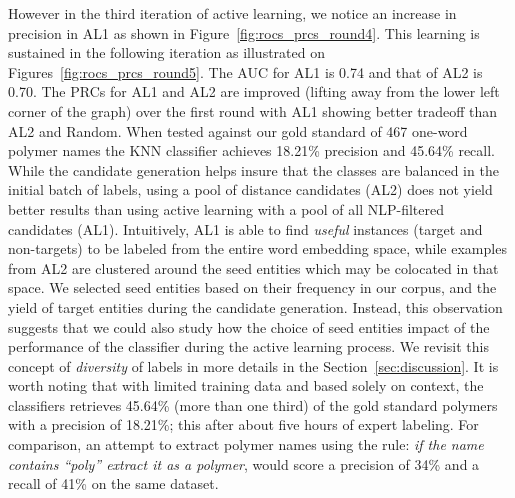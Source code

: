 However in the third iteration of active learning, we notice an increase in precision in AL1 as shown in Figure~\ref{fig:rocs_prcs_round4}.
This learning is sustained in the following iteration as illustrated on Figures~\ref{fig:rocs_prcs_round5}. 
The AUC for AL1 is 0.74 and that of AL2 is 0.70. 
The PRCs for AL1 and AL2 are improved (lifting away from the lower left corner of the graph) over the first round with AL1 showing better tradeoff than AL2 and Random.
When tested against our gold standard of 467 one-word polymer names the KNN classifier achieves 18.21\% precision and  45.64\% recall. 
While the candidate generation helps insure that the classes are balanced in the initial batch of labels, using a pool of distance candidates (AL2) does not yield better results than using active learning with a pool of all NLP-filtered candidates (AL1).
Intuitively, AL1 is able to find \textit{useful} instances (target and non-targets) to be labeled from the entire word embedding space, while examples from AL2 are clustered around the seed entities which may be colocated in that space.
We selected seed entities based on their frequency in our corpus, and the yield of target entities during the candidate generation.
Instead, this observation suggests that we could also study how the choice of seed entities impact of the performance of the classifier during the active learning process. 
We revisit this concept of \textit{diversity} of labels in more details in the Section~\ref{sec:discussion}. 
It is worth noting that with limited training data and based solely on context, the classifiers retrieves 45.64\% (more than one third) of the gold standard polymers with a precision of 18.21\%; this after about five hours of expert labeling. 
For comparison, an attempt to extract polymer names using the rule: \textit{if the name contains ``poly'' extract it as a polymer}, would score a precision of 34\% and a recall of 41\% on the same dataset.

